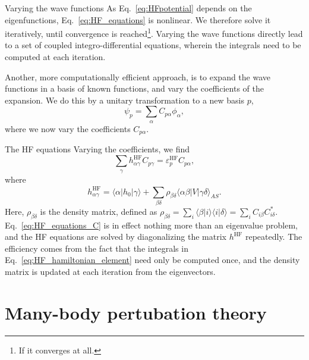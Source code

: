 \documentclass[UKenglish,aspectratio=169]{beamer}
\begin{document}
\begin{frame}{Varying the wave functions}
    As Eq.~\eqref{eq:HFpotential} depends on the eigenfunctions,
    Eq.~\eqref{eq:HF_equations} is nonlinear.
    We therefore solve it iteratively, until convergence is
    reached\footnote{If it converges at all.}.
    Varying the wave functions directly lead to a set of coupled
    integro-differential equations, wherein the integrals need to be
    computed at each iteration.

    \bigskip

    Another, more computationally efficient approach, is to expand
    the wave functions in a basis of known functions, and vary the
    coefficients of the expansion.
    We do this by a unitary transformation to a new basis $p$,
    \begin{equation}
        \psi_p = \sum_{\alpha} C_{p\alpha} \phi_\alpha,
    \end{equation}
    where we now vary the coefficients $C_{p\alpha}$.
\end{frame}

\begin{frame}{The HF equations}
    Varying the coefficients, we find
    \begin{equation}\label{eq:HF_equations_C}
        \sum_{\gamma} h_{\alpha\gamma}^{\mathrm{HF}} C_{p \gamma}
        = \varepsilon_p^{\mathrm{HF}} C_{p \alpha},
    \end{equation}
    where
    \begin{equation}\label{eq:HF_hamiltonian_element}
        h_{\alpha \gamma}^\mathrm{HF}
        = \langle \alpha \vert \hat{h}_0 \vert \gamma \rangle
        + \sum_{\beta\delta} \rho_{\beta\delta} \langle \alpha\beta \vert V \vert \gamma\delta \rangle_{AS}.
    \end{equation}
    Here, $\rho_{\beta\delta}$ is the density matrix, defined as
    $\rho_{\beta\delta} = \sum_{i} \langle \beta \vert i \rangle
    \langle i \vert \delta \rangle = \sum_{i} C_{i\beta} C_{i\delta}^*$.
    Eq.~\eqref{eq:HF_equations_C} is in effect nothing more than an
    eigenvalue problem, and the HF equations are solved by
    diagonalizing the matrix $h^\mathrm{HF}$ repeatedly.
    The efficiency comes from the fact that the integrals in
    Eq.~\eqref{eq:HF_hamiltonian_element} need only be computed once,
    and the density matrix is updated at each iteration from the eigenvectors.
\end{frame}

\section{Many-body pertubation theory}
\end{document}
